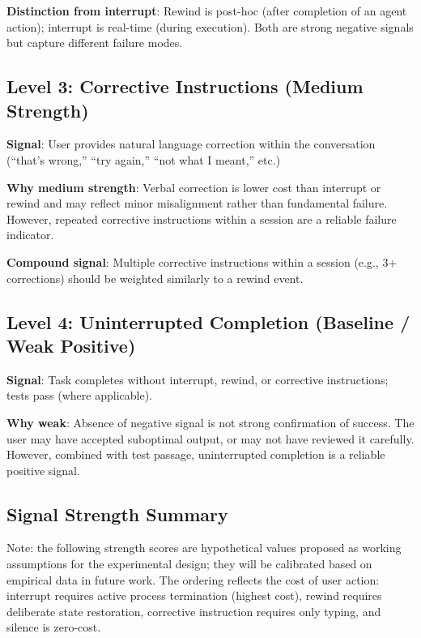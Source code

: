\documentclass[conference]{IEEEtran}
\begin{document}
\textbf{Distinction from interrupt}: Rewind is post-hoc (after completion of an agent action); interrupt is real-time (during execution). Both are strong negative signals but capture different failure modes.

\subsection{Level 3: Corrective Instructions (Medium Strength)}

\textbf{Signal}: User provides natural language correction within the conversation (``that's wrong,'' ``try again,'' ``not what I meant,'' etc.)

\textbf{Why medium strength}: Verbal correction is lower cost than interrupt or rewind and may reflect minor misalignment rather than fundamental failure. However, repeated corrective instructions within a session are a reliable failure indicator.

\textbf{Compound signal}: Multiple corrective instructions within a session (e.g., 3+ corrections) should be weighted similarly to a rewind event.

\subsection{Level 4: Uninterrupted Completion (Baseline / Weak Positive)}

\textbf{Signal}: Task completes without interrupt, rewind, or corrective instructions; tests pass (where applicable).

\textbf{Why weak}: Absence of negative signal is not strong confirmation of success. The user may have accepted suboptimal output, or may not have reviewed it carefully. However, combined with test passage, uninterrupted completion is a reliable positive signal.

\subsection{Signal Strength Summary}

Note: the following strength scores are hypothetical values proposed as working assumptions for the experimental design; they will be calibrated based on empirical data in future work. The ordering reflects the cost of user action: interrupt requires active process termination (highest cost), rewind requires deliberate state restoration, corrective instruction requires only typing, and silence is zero-cost.
\end{document}

